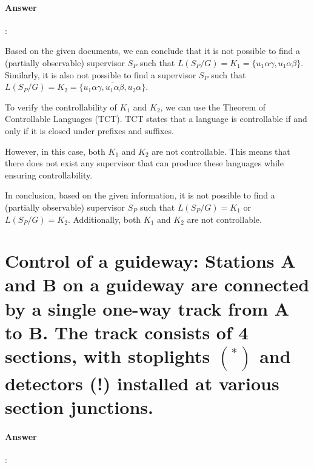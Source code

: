 \documentclass{article}
\begin{document}
\paragraph{Answer}:

Based on the given documents, we can conclude that it is not possible to find a (partially observable) supervisor $S_P$ such that $L(S_P / G) = K_1=\overline{\{u_1 \alpha \gamma, u_1 \alpha \beta\}}$. Similarly, it is also not possible to find a supervisor $S_P$ such that $L(S_P / G) = K_2=\overline{\{u_1 \alpha \gamma, u_1 \alpha \beta, u_2 \alpha\}}$.

To verify the controllability of $K_1$ and $K_2$, we can use the Theorem of Controllable Languages (TCT). TCT states that a language is controllable if and only if it is closed under prefixes and suffixes. 

However, in this case, both $K_1$ and $K_2$ are not controllable. This means that there does not exist any supervisor that can produce these languages while ensuring controllability.

In conclusion, based on the given information, it is not possible to find a (partially observable) supervisor $S_P$ such that $L(S_P / G) = K_1$ or $L(S_P / G) = K_2$. Additionally, both $K_1$ and $K_2$ are not controllable.


\section{Control of a guideway: Stations A and B on a guideway are connected by a single one-way track from A to B. The track consists of 4 sections, with stoplights $\left({ }^*\right)$ and detectors (!) installed at various section junctions.}

\paragraph{Answer}:
\end{document}
